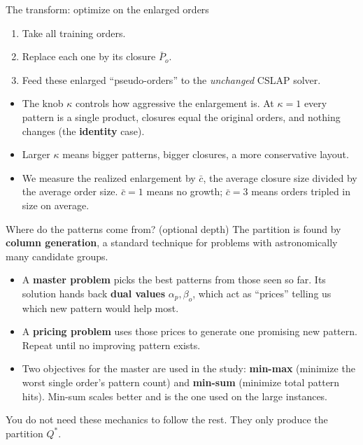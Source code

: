 \documentclass[11pt,aspectratio=169]{beamer}
\newcommand{\term}[1]{\textcolor{blue!60!black}{\textbf{#1}}}
\begin{document}
\begin{frame}{The transform: optimize on the enlarged orders}
  \begin{enumerate}
    \item Take all training orders.
    \item Replace each one by its closure $\bar P_o$.
    \item Feed these enlarged ``pseudo-orders'' to the \emph{unchanged} CSLAP solver.
  \end{enumerate}
  \begin{itemize}
    \item The knob $\kappa$ controls how aggressive the enlargement is. At $\kappa=1$ every pattern is a single product, closures equal the original orders, and nothing changes (the \term{identity} case).
    \item Larger $\kappa$ means bigger patterns, bigger closures, a more conservative layout.
    \item We measure the realized enlargement by $\bar c$, the average closure size divided by the average order size. $\bar c=1$ means no growth; $\bar c=3$ means orders tripled in size on average.
  \end{itemize}
\end{frame}

\begin{frame}{Where do the patterns come from? (optional depth)}
  The partition is found by \term{column generation}, a standard technique for problems with astronomically many candidate groups.
  \begin{itemize}
    \item A \term{master problem} picks the best patterns from those seen so far. Its solution hands back \term{dual values} $\alpha_p,\beta_o$, which act as ``prices'' telling us which new pattern would help most.
    \item A \term{pricing problem} uses those prices to generate one promising new pattern. Repeat until no improving pattern exists.
    \item Two objectives for the master are used in the study: \term{min-max} (minimize the worst single order's pattern count) and \term{min-sum} (minimize total pattern hits). Min-sum scales better and is the one used on the large instances.
  \end{itemize}
  You do not need these mechanics to follow the rest. They only produce the partition $Q^*$.
\end{frame}
\end{document}
